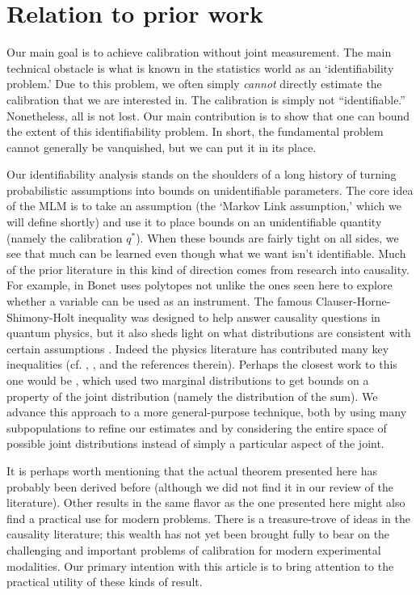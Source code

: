 \section{Relation to prior work}

Our main goal is to achieve calibration without joint measurement.  The main technical obstacle is what is known in the statistics world as an `identifiability problem.'  Due to this problem, we often simply \emph{cannot} directly estimate the calibration that we are interested in.  The calibration is simply not ``identifiable.''  Nonetheless, all is not lost.  Our main contribution is to show that one can bound the extent of this identifiability problem.  In short, the fundamental problem cannot generally be vanquished, but we can put it in its place.  

Our identifiability analysis stands on the shoulders of a long history of turning probabilistic assumptions into bounds on unidentifiable parameters.  The core idea of the MLM is to take an assumption (the `Markov Link assumption,' which we will define shortly) and use it to place bounds on an unidentifiable quantity (namely the calibration $q^*$).  When these bounds are fairly tight on all sides, we see that much can be learned even though what we want isn't identifiable.  Much of the prior literature in this kind of direction comes from research into causality.  For example, in \cite{bonet2001instrumentality} Bonet uses polytopes not unlike the ones seen here to explore whether a variable can be used as an instrument.  The famous Clauser-Horne-Shimony-Holt inequality was designed to help answer causality questions in quantum physics, but it also sheds light on what distributions are consistent with certain assumptions \cite{clauser1969proposed}.  Indeed the physics literature has contributed many key inequalities (cf. \cite{chaves2014inferring}, \cite{kela2017semidefinite}, and the references therein).  Perhaps the closest work to this one would be \cite{makarov1982estimates}, which used two marginal distributions to get bounds on a property of the joint distribution (namely the distribution of the sum).  We advance this approach to a more general-purpose technique, both by using many subpopulations to refine our estimates and by considering the entire space of possible joint distributions instead of simply a particular aspect of the joint.  

It is perhaps worth mentioning that the actual theorem presented here has probably been derived before (although we did not find it in our review of the literature).  Other results in the same flavor as the one presented here might also find a practical use for modern problems.  There is a treasure-trove of ideas in the causality literature; this wealth has not yet been brought fully to bear on the challenging and important problems of calibration for modern experimental modalities.  Our primary intention with this article is to bring attention to the practical utility of these kinds of result.

